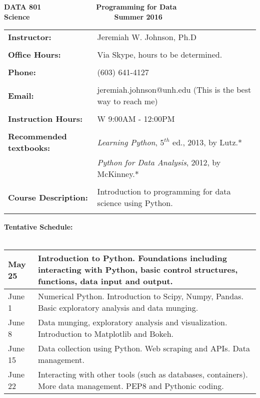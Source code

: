 \documentclass{article}
\begin{document}
\noindent\begin{center}{
	\large{\textbf{DATA 801 \ \ \ \ \ \ \ \ \ \ \ \ \ Programming for Data Science\ \ \ \ \ \ \ \ \ \ \ \ \ \ \ \ \ \ \ \ \ Summer 2016}}
	}
\end{center}	
	
\vspace{0.2in}

\begin{tabular}{lp{5in}}
\noindent\textbf{Instructor:}& Jeremiah W. Johnson, Ph.D \\
\\
\noindent\textbf{Office Hours:}& Via Skype, hours to be determined. \\
\\
\noindent\textbf{Phone:}& (603) 641-4127 \\
\\
\noindent\textbf{Email:}& jeremiah.johnson@unh.edu (This is the best way to reach me) \\
\\
\noindent\textbf{Instruction Hours:}& W 9:00AM - 12:00PM \\
\\
\noindent\textbf{Recommended textbooks:}& \emph{Learning Python}, $5^{th}$ ed., 2013, by Lutz.* \\ 
& \emph{Python for Data Analysis}, 2012, by McKinney.*\\
\\
\noindent\textbf{Course Description:}& Introduction to programming for data science using Python. \\
\\
\end{tabular}
\noindent\textbf{Tentative Schedule:} \\
	\\
	\begin{tabular}{| p{2in} | p{4in} |}\hline
		May 25 & Introduction to Python. Foundations including interacting with Python, basic control structures, functions, data input and output.  \\ \hline
		June 1 & Numerical Python. Introduction to Scipy, Numpy, Pandas. Basic exploratory analysis and data munging. \\ \hline
		June 8 & Data munging, exploratory analysis and visualization. Introduction to Matplotlib and Bokeh. \\ \hline
		June 15 & Data collection using Python. Web scraping and APIs. Data management.  \\ \hline
		June 22 & Interacting with other tools (such as databases, containers). More data management. PEP8 and Pythonic coding. \\ \hline 
	\end{tabular}
\\
\end{document}
